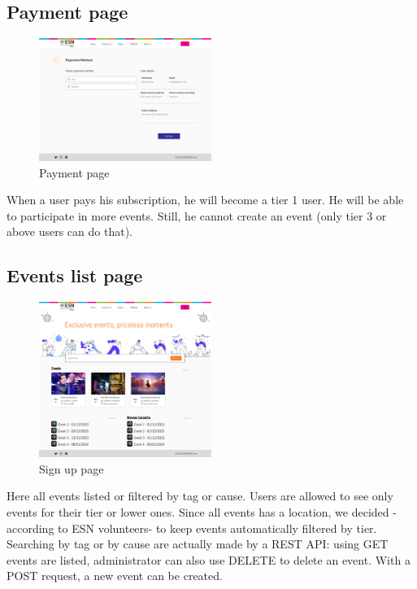 \subsection{Payment page}
\begin{figure}[H]
    \centering
    \includegraphics[width=0.5\textwidth]{images/PaymentMethod.png}
    \caption{Payment page}
    \label{fig:payment}
\end{figure}
When a user pays his subscription, he will become a tier 1 user. He will be able to participate in more
events. Still, he cannot create an event (only tier 3 or above users can do that). 
\subsection{Events list page}
\begin{figure}[H]
    \centering
    \includegraphics[width=0.5\textwidth]{images/EventList.png}
    \caption{Sign up page}
    \label{fig:events}
\end{figure}
Here all events listed or filtered by tag or cause. Users are allowed to see only events for their tier
or lower ones. Since all events has a location, we decided -according to ESN volunteers- to keep
events automatically filtered by tier.\\
Searching by tag or by cause are actually made by a REST API: using GET events are listed, administrator
can also use DELETE to delete an event. With a POST request, a new event can be created.\\
